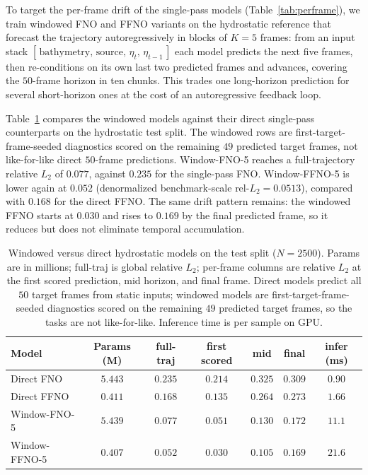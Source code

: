 To target the per-frame drift of the single-pass models (Table~\ref{tab:perframe}), we train windowed FNO and FFNO variants on the hydrostatic reference that forecast the trajectory autoregressively in blocks of $K = 5$ frames: from an input stack $[\,\text{bathymetry},\, \text{source},\, \eta_t,\, \eta_{t - 1}\,]$ each model predicts the next five frames, then re-conditions on its own last two predicted frames and advances, covering the $50$-frame horizon in ten chunks. This trades one long-horizon prediction for several short-horizon ones at the cost of an autoregressive feedback loop.

Table~\ref{tab:window} compares the windowed models against their direct single-pass counterparts on the hydrostatic test split. The windowed rows are first-target-frame-seeded diagnostics scored on the remaining $49$ predicted target frames, not like-for-like direct $50$-frame predictions. Window-FNO-5 reaches a full-trajectory relative $L_2$ of $0.077$, against $0.235$ for the single-pass FNO. Window-FFNO-5 is lower again at $0.052$ (denormalized benchmark-scale rel-$L_2 = 0.0513$), compared with $0.168$ for the direct FFNO. The same drift pattern remains: the windowed FFNO starts at $0.030$ and rises to $0.169$ by the final predicted frame, so it reduces but does not eliminate temporal accumulation.

\begin{table}[H]
\centering
\caption{Windowed versus direct hydrostatic models on the test split ($N = 2500$). Params are in millions; full-traj is global relative $L_2$; per-frame columns are relative $L_2$ at the first scored prediction, mid horizon, and final frame. Direct models predict all $50$ target frames from static inputs; windowed models are first-target-frame-seeded diagnostics scored on the remaining $49$ predicted target frames, so the tasks are not like-for-like. Inference time is per sample on GPU.}
\label{tab:window}
\small
\begin{tabular}{lcccccc}
    \toprule
    Model & Params (M) & full-traj & first scored & mid & final & infer (ms) \\
    \midrule
    Direct FNO       & $5.443$ & $0.235$ & $0.214$ & $0.325$ & $0.309$ & $0.90$ \\
    Direct FFNO      & $0.411$ & $0.168$ & $0.135$ & $0.264$ & $0.273$ & $1.66$ \\
    Window-FNO-5     & $5.439$ & $0.077$ & $0.051$ & $0.130$ & $0.172$ & $11.1$ \\
    Window-FFNO-5    & $0.407$ & $\mathbf{0.052}$ & $\mathbf{0.030}$ & $\mathbf{0.105}$ & $\mathbf{0.169}$ & $21.6$ \\
    \bottomrule
\end{tabular}
\end{table}

